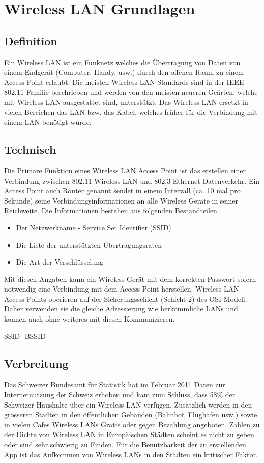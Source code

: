 \chapter{Wireless LAN Grundlagen}
\label{sec:TheoretischeGrundlagen}

\section{Definition}
Ein Wireless LAN ist ein Funknetz welches die Übertragung von Daten von einem Endgerät (Computer, Handy, usw.) durch den offenen Raum zu einem Access Point erlaubt. Die meisten Wireless LAN Standards sind in der IEEE-802.11 Familie beschrieben und werden von den meisten neueren Geärten, welche mit Wireless LAN ausgestattet sind, unterstützt. Das Wireless LAN ersetzt in vielen Bereichen das LAN bzw. das Kabel, welches früher für die Verbindung mit einem LAN benötigt wurde.

\section{Technisch}
Die Primäre Funktion eines Wireless LAN Access Point ist das erstellen einer Verbindung zwischen 802.11 Wireless LAN und 802.3 Ethernet Datenverkehr. Ein Access Point auch Router genannt sendet in einem Intervall (ca. 10 mal pro Sekunde) seine Verbindungsinformationen an alle Wireless Geräte in seiner Reichweite. Die Informationen bestehen aus folgenden Bestandteilen.
\begin{itemize}
\item Der Netzwerkname - Service Set Identifier (SSID)
\item Die Liste der unterstützten Übertragungsraten
\item Die Art der Verschlüsselung
\end{itemize}
Mit diesen Angaben kann ein Wireless Gerät mit dem korrekten Passwort sofern notwendig eine Verbindung mit dem Access Point herstellen. Wireless LAN Access Points operieren auf der Sicherungsschicht (Schicht 2) des OSI Modell. Daher verwenden sie die gleiche Adressierung wie herkömmliche LANs und können auch ohne weiteres mit diesen Kommunizieren.

SSID -BSSID


\section{Verbreitung}
Das Schweizer Bundesamt für Statistik hat im Februar 2011 Daten zur Internetnutzung der Schweiz erhoben und kam zum Schluss, dass 58\% der Schweizer Haushalte über ein Wireless LAN verfügen\citep[S. 8]{bfs.internet.2011}. Zusätzlich werden in den grösseren Städten in den öffentlichen Gebäuden (Bahnhof, Flughafen usw.) sowie in vielen Cafes Wireless LANs Gratis oder gegen Bezahlung angeboten. Zahlen zu der Dichte von Wireless LAN in Europäischen Städten scheint es nicht zu geben oder sind sehr schwierig zu Finden. Für die Benutzbarkeit der zu erstellenden App ist das Aufkommen von Wireless LANs in den Städten ein kritischer Faktor.

